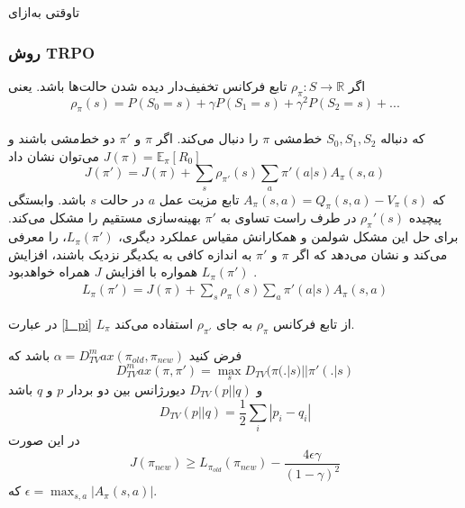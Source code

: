 

‌تاوقتی
‌به‌ازای
\subsubsection{روش TRPO}
اگر
$\rho_\pi : S \longrightarrow \mathbb{R}$
تابع فرکانس تخفیف‌دار دیده شدن حالت‌ها باشد. یعنی $$\rho_\pi(s) = P(S_0=s) + \gamma P(S_1=s) + \gamma^2 P(S_2=s) + ...$$ \\که دنباله $S_0, S_1, S_2$ خط‌مشی $\pi$ را دنبال می‌کند.
اگر $\pi$ و $\pi'$ دو خط‌مشی باشند و  $J(\pi) = \mathbb{E}_\pi[R_0]$  می‌توان نشان داد 
$$J(\pi')= J(\pi) + \sum_{s} \rho_{\pi'}(s) \sum_{a} \pi'(a|s) A_\pi(s,a)$$ که  $A_\pi(s,a) = Q_\pi (s,a) - V_\pi(s)$ تابع مزیت عمل $a$ در حالت $s$ باشد.
وابستگی پیچیده  $\rho_\pi'(s)$ در طرف راست تساوی به $\pi'$ بهینه‌سازی مستقیم را مشکل می‌کند.
برای حل این مشکل شولمن و همکارانش 
مقیاس عملکرد دیگری، $L_\pi(\pi')$، را معرفی می‌کند و نشان می‌دهد که اگر $\pi$ و $\pi'$ به اندازه کافی به یکدیگر نزدیک باشند، افزایش  $L_\pi(\pi')$  همواره با افزایش $J$ همراه خواهد‌بود \cite{schulman2015trust}.
\begin{align}
L_\pi(\pi')= J(\pi) + \sum_{s} \rho_{\pi}(s) \sum_{a} \pi'(a|s) A_\pi(s,a)
\label{l_pi}
\end{align}


در عبارت 
\ref{l_pi}
 $L_\pi$ از تابع فرکانس $\rho_\pi$ به جای $
\rho_{\pi'}$
 استفاده می‌کند.
 
فرض کنید 
$\alpha = D_{TV}^max(\pi_{old}, \pi_{new})$
باشد که 
$$D_{TV}^max (\pi, \pi') = \max_{s} D_{TV}(\pi(.|s) || \pi'(.|s)$$
و 
$D_{TV}(p || q)$
دیورژانس 
 بین دو بردار $p$ و $q$ باشد
$$D_{TV}(p || q) = \dfrac{1}{2} \sum_{i} |p_i - q_i|$$ در این صورت
$$J(\pi_{new}) \ge L_{\pi_{old}}(\pi_{new}) - \dfrac{4 \epsilon \gamma}{(1- \gamma)^2}$$ که $\epsilon = \max_{s,a} |A_\pi(s,a)|$.
\label{q:ghas}

